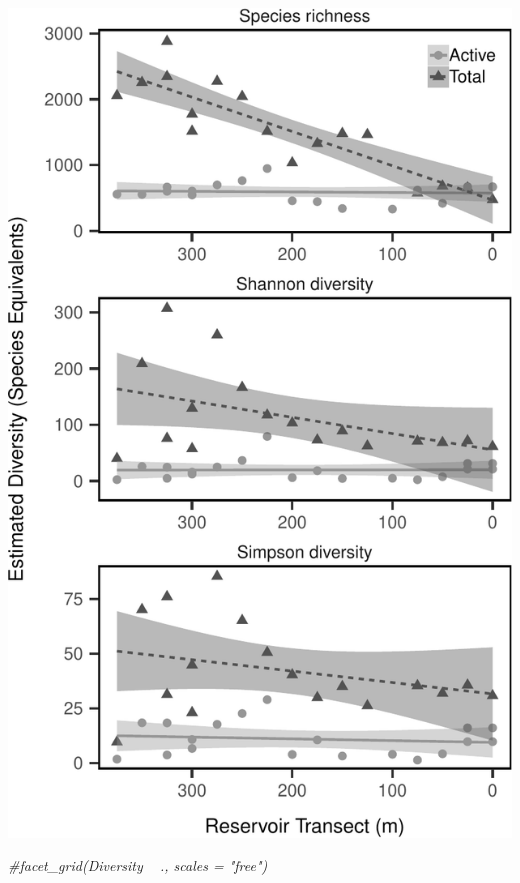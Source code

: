 \documentclass[]{article}
\newenvironment{Shaded}{\begin{snugshade}}{\end{snugshade}}
\newcommand{\CommentTok}[1]{\textcolor[rgb]{0.56,0.35,0.01}{\textit{#1}}}
\begin{document}
\begin{center}\includegraphics{ReservoirGradient_files/figure-latex/hill_div_plot-1} \end{center}

\begin{Shaded}
\begin{Highlighting}[]
  \CommentTok{#facet_grid(Diversity ~ ., scales = "free")}
\end{Highlighting}
\end{Shaded}
\end{document}
